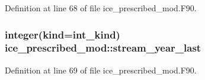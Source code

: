Definition at line 68 of file ice\_\-prescribed\_\-mod.F90.\hypertarget{namespaceice__prescribed__mod_ade5d68f1b7b652dcacb5263e02aaa099}{
\subsubsection[{stream\_\-year\_\-last}]{\setlength{\rightskip}{0pt plus 5cm}integer(kind=int\_\-kind) {\bf ice\_\-prescribed\_\-mod::stream\_\-year\_\-last}}}
\label{namespaceice__prescribed__mod_ade5d68f1b7b652dcacb5263e02aaa099}


Definition at line 69 of file ice\_\-prescribed\_\-mod.F90.